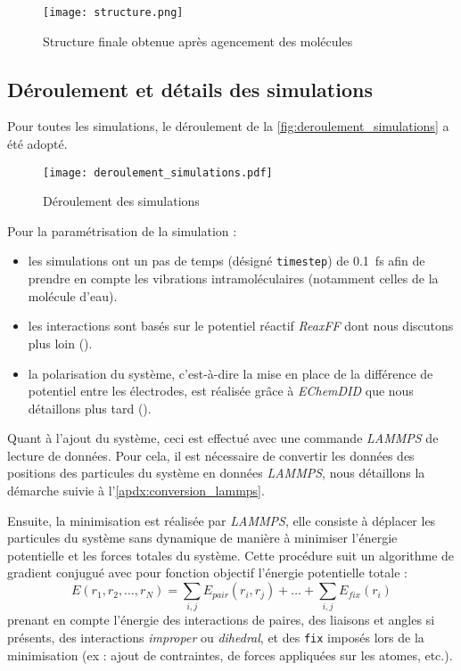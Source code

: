 \begin{figure}[hbp]
    \centering
    \texttt{[image: structure.png]}
    \caption{Structure finale obtenue après agencement des molécules}
    \label{fig:structure_finale}
\end{figure}

    \subsection{Déroulement et détails des simulations}

Pour toutes les simulations, le déroulement de la \autoref{fig:deroulement_simulations} a été adopté.

\begin{figure}[htp]
    \centering
    \texttt{[image: deroulement\_simulations.pdf]}
    \caption{Déroulement des simulations}
    \label{fig:deroulement_simulations}
\end{figure}

Pour la paramétrisation de la simulation :
\begin{itemize}
    \item les simulations ont un pas de temps (désigné \lstinline!timestep!) de \qty{0.1}{\femto \second} afin de prendre en compte les vibrations intramoléculaires (notamment celles de la molécule d'eau). 
    \item les interactions sont basés sur le potentiel réactif \emph{ReaxFF} dont nous discutons plus loin ().
    \item la polarisation du système, c'est-à-dire la mise en place de la différence de potentiel entre les électrodes, est réalisée grâce à \emph{EChemDID} que nous détaillons plus tard ().
\end{itemize}

Quant à l'ajout du système, ceci est effectué avec une commande \emph{LAMMPS} de lecture de données. Pour cela, il est nécessaire de convertir les données des positions des particules du système en données \emph{LAMMPS}, nous détaillons la démarche suivie à l'\autoref{apdx:conversion_lammps}.

Ensuite, la minimisation est réalisée par \emph{LAMMPS}, elle consiste à déplacer les particules du système sans dynamique de manière à minimiser l'énergie potentielle et les forces totales du système. Cette procédure suit un algorithme de gradient conjugué avec pour fonction objectif l'énergie potentielle totale :
\begin{equation}
    E(r_1, r_2, \dots, r_N) = \sum_{i, j} E_{pair} (r_i, r_j) + \dots + \sum_{i, j} E_{fix} (r_i)
\end{equation}
prenant en compte l'énergie des interactions de paires, des liaisons et angles si présents, des interactions \textit{improper} ou \textit{dihedral}, et des \lstinline!fix! imposés lors de la minimisation (ex : ajout de contraintes, de forces appliquées sur les atomes, etc.).

